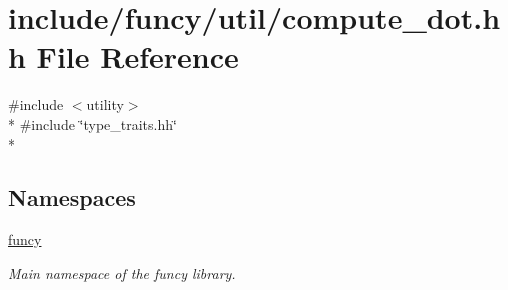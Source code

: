 \hypertarget{compute__dot_8hh}{\section{include/funcy/util/compute\-\_\-dot.hh File Reference}
\label{compute__dot_8hh}
}
{\ttfamily \#include $<$utility$>$}\\*
{\ttfamily \#include \char`\"{}type\-\_\-traits.\-hh\char`\"{}}\\*
\subsection*{Namespaces}
\begin{DoxyCompactItemize}
\item 
\hyperlink{namespacefuncy}{funcy}
\begin{DoxyCompactList}\small\item\em Main namespace of the funcy library. \end{DoxyCompactList}\end{DoxyCompactItemize}
